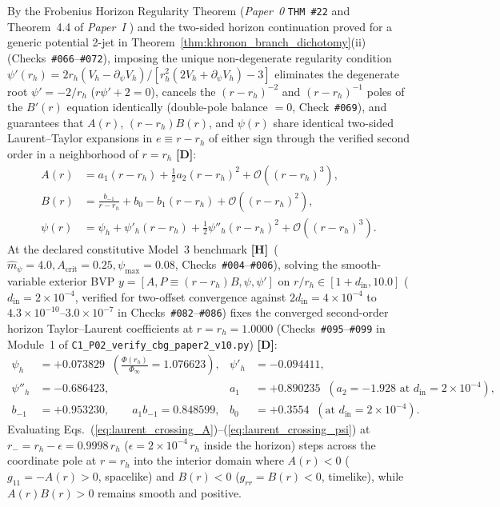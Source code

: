 \documentclass[11pt,a4paper]{article}
\newcommand{\catD}{\textbf{\textcolor{blue!75!black}{[D]}}}
\newcommand{\catH}{\textbf{\textcolor{orange!85!black}{[H]}}}
\theoremstyle{plain}
\theoremstyle{definition}
\theoremstyle{remark}
\numberwithin{equation}{section}
\begin{document}
By the Frobenius Horizon Regularity Theorem (\textit{Paper~0} \texttt{THM~\#22} \cite{jimenez2026_p0} and Theorem~4.4 of \textit{Paper~I} \cite{jimenez2026a}) and the two-sided horizon continuation proved for a generic potential 2-jet in Theorem~\ref{thm:khronon_branch_dichotomy}(ii) (Checks~\texttt{\#066}--\texttt{\#072}), imposing the unique non-degenerate regularity condition $\psi'(r_h) = 2r_h(V_h - \partial_{\psi}V_h)/[r_h^2(2V_h + \partial_{\psi}V_h) - 3]$ eliminates the degenerate root $\psi' = -2/r_h$ ($r\psi' + 2 = 0$), cancels the $(r - r_h)^{-2}$ and $(r - r_h)^{-1}$ poles of the $B'(r)$ equation identically (double-pole balance $= 0$, Check~\texttt{\#069}), and guarantees that $A(r)$, $(r - r_h)B(r)$, and $\psi(r)$ share identical two-sided Laurent--Taylor expansions in $e \equiv r - r_h$ of either sign through the verified second order in a neighborhood of $r = r_h$ \catD:
\begin{align}
  A(r) &= a_1\left(r - r_h\right) + \frac{1}{2}a_2\left(r - r_h\right)^2 + \mathcal{O}\!\left((r - r_h)^3\right), \label{eq:laurent_crossing_A} \\[3pt]
  B(r) &= \frac{b_{-1}}{r - r_h} + b_0 - b_1\left(r - r_h\right) + \mathcal{O}\!\left((r - r_h)^2\right), \label{eq:laurent_crossing_B} \\[3pt]
  \psi(r) &= \psi_h + \psi'_h\left(r - r_h\right) + \frac{1}{2}\psi''_h\left(r - r_h\right)^2 + \mathcal{O}\!\left((r - r_h)^3\right). \label{eq:laurent_crossing_psi}
\end{align}
At the declared constitutive Model~3 benchmark \catH\ ($\hat{m}_{\psi} = 4.0, A_{\text{crit}} = 0.25, \psi_{\max} = 0.08$, Checks~\texttt{\#004}--\texttt{\#006}), solving the smooth-variable exterior BVP $y = [A, P \equiv (r - r_h)B, \psi, \psi']$ on $r/r_h \in [1 + d_{\text{in}}, 10.0]$ ($d_{\text{in}} = 2 \times 10^{-4}$, verified for two-offset convergence against $2 d_{\text{in}} = 4 \times 10^{-4}$ to $4.3 \times 10^{-10}\text{--}3.0 \times 10^{-7}$ in Checks~\texttt{\#082}--\texttt{\#086}) fixes the converged second-order horizon Taylor--Laurent coefficients at $r = r_h = 1.0000$ (Checks~\texttt{\#095}--\texttt{\#099} in Module~1 of \allowbreak\texttt{C1\_P02\_verify\_cbg\_paper2\_v10.py}) \catD:
\begin{align}
  \psi_h &= +0.073829 \;\;\left(\frac{\Phi(r_h)}{\Phi_{\infty}} = \mathbf{1.076623}\right), &
  \psi'_h &= \mathbf{-0.094411}, \nonumber \\[3pt]
  \psi''_h &= \mathbf{-0.686423}, &
  a_1 &= \mathbf{+0.890235} \;\;\left(a_2 = -1.928\text{ at } d_{\text{in}} = 2 \times 10^{-4}\right), \nonumber \\[3pt]
  b_{-1} &= \mathbf{+0.953230}, \qquad a_1 b_{-1} = \mathbf{0.848599}, &
  b_0 &= \mathbf{+0.3554} \;\;\left(\text{at } d_{\text{in}} = 2 \times 10^{-4}\right).
  \label{eq:exact_frob_horizon_coeffs}
\end{align}
Evaluating Eqs.~(\ref{eq:laurent_crossing_A})--(\ref{eq:laurent_crossing_psi}) at $r_- = r_h - \epsilon = 0.9998\,r_h$ ($\epsilon = 2 \times 10^{-4}\,r_h$ inside the horizon) steps across the coordinate pole at $r = r_h$ into the interior domain where $A(r) < 0$ ($g_{11} = -A(r) > 0$, spacelike) and $B(r) < 0$ ($g_{rr} = B(r) < 0$, timelike), while $A(r)B(r) > 0$ remains smooth and positive.
\end{document}
